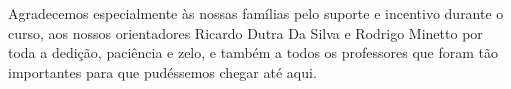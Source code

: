 
\begin{agradecimentos}[Agradecimentos]

Agradecemos especialmente às nossas famílias pelo suporte e incentivo durante o curso, aos nossos orientadores Ricardo Dutra Da Silva e Rodrigo Minetto por toda a dedição, paciência e zelo, e também a todos os professores que foram tão importantes para que pudéssemos chegar até aqui.

\end{agradecimentos}
